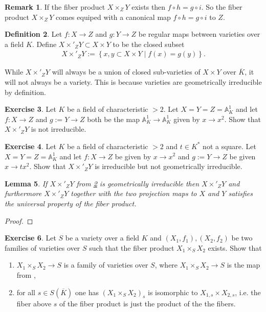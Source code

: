 \documentclass[a4paper,12pt,reqno]{amsart}
\newcommand{\set}[1]{\left\lbrace #1 \right\rbrace}
\newcommand{\field}[1]{\mathbb{#1}}  %
\newcommand{\A}{\field{A}}
\newtheorem{lemma}{Lemma}
\theoremstyle{definition}
\newtheorem{definition}[lemma]{Definition}
\newtheorem{exercise}[lemma]{Exercise}
\newtheorem{remark}[lemma]{Remark}
\numberwithin{lemma}{section}
\numberwithin{equation}{section}
\numberwithin{figure}{section}
\begin{document}
\begin{remark}\label{rem:fiber-product-map-to-base}
If the fiber product $X \times_Z Y$ exists then $f \circ h = g \circ i$. So the fiber product  $X \times_Z Y$ comes equiped with a canonical map $f \circ h = g \circ i$  to $Z$.
\end{remark}


\begin{definition}\label{def:fiber_product_concrete}
Let $f: X \to Z$ and $g : Y \to Z$ be regular maps between varieties over a field $K$. Define $X\times'_Z Y \subset X \times Y$ to be the closed subset
\begin{align*}
X\times'_Z Y :=\set{x,y \subset X \times Y \mid f(x)=g(y)}.
\end{align*}
\end{definition}

While $X\times'_Z Y$ will always be a union of closed sub-varieties of $X \times Y$ over $\overline K$, it will not always be a variety. This is because varieties are geometrically irreducible by definition.

\begin{exercise}
Let $K$ be a field of characteristic $>2$.	Let $X = Y = Z = \A^1_K$ and let $f: X \to Z$ and $g := Y\to Z$ both be the map $\A^1_K \to   \A^1_K$ given by $x \to x^2$. Show that $X\times'_Z Y$ is not irreducible.
\end{exercise}

\begin{exercise}
	Let $K$ be a field of characteristic $>2$ and $t \in K^*$ not a square.	Let $X = Y = Z = \A^1_K$ and let $f: X \to Z$ be given by $x \to x^2$ and $g := Y\to Z$ be given $x \to tx^2$. Show that $X\times'_Z Y$ is irreducible but not geometrically irreducible.
\end{exercise}

\begin{lemma}
If $X\times'_Z Y$ from \cref{def:fiber_product_concrete} is geometrically irreducible then $X\times'_Z Y$ and furthermore $X\times'_Z Y$ together with the two projection maps to $X$ and $Y$ satisfies the universal property of the fiber product.
\end{lemma}
\begin{proof}
\end{proof}

\begin{exercise}
	Let $S$ be a variety over a field $K$ and $(X_1,f_1), (X_2,f_2)$ be two families of varieties over $S$ such that the fiber product $X_1 \times_S X_2$ exists. Show that 
	\begin{enumerate}
		\item $X_1 \times_S X_2 \to S$ is a family of varieties over $S$, where $X_1 \times_S X_2 \to S$ is the map from ,
		\item for all $s \in S(\overline K)$ one has $(X_1 \times_S X_2)_s$ is isomorphic to $X_{1,s} \times X_{2,s}$, i.e. the fiber above $s$ of the fiber product is just the product of the the fibers.

	\end{enumerate}
\end{exercise}
\end{document}
